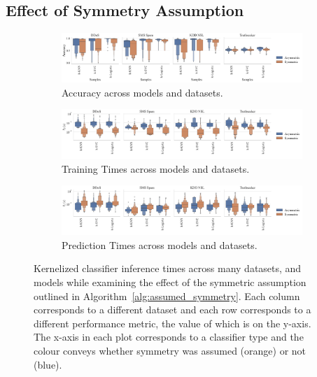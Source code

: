 \documentclass[conference]{IEEEtran}
\begin{document}
\subsection{Effect of Symmetry Assumption}



\begin{figure}[t]
    \centering
    \begin{subfigure}[t]{\textwidth}
        \includegraphics[width=\textwidth]{figs/combined/symmetric_models_vs_accuracy.pdf}
        \caption{Accuracy across models and datasets.}
        \label{fig:symm_acc}
    \end{subfigure}
    \begin{subfigure}[t]{\textwidth}
        \centering
        \includegraphics[width=\textwidth]{figs/combined/symmetric_models_vs_train_time.pdf}
        \caption{Training Times across models and datasets.}
        \label{fig:sym_train_time}
    \end{subfigure}
    \begin{subfigure}[t]{\textwidth}
        \includegraphics[width=\textwidth]{figs/combined/symmetric_models_vs_predict_time.pdf}
        \caption{Prediction Times across models and datasets.}
        \label{fig:sym_pred_time}
    \end{subfigure}
    \caption{Kernelized classifier inference times across many datasets, and models while examining the effect of the symmetric assumption outlined in Algorithm~\ref{alg:assumed_symmetry}. Each column corresponds to a different dataset and each row corresponds to a different performance metric, the value of which is on the y-axis. The x-axis in each plot corresponds to a classifier type and the colour conveys whether symmetry was assumed (orange) or not (blue).}
    \label{fig:symm_summary}
\end{figure}
\end{document}
